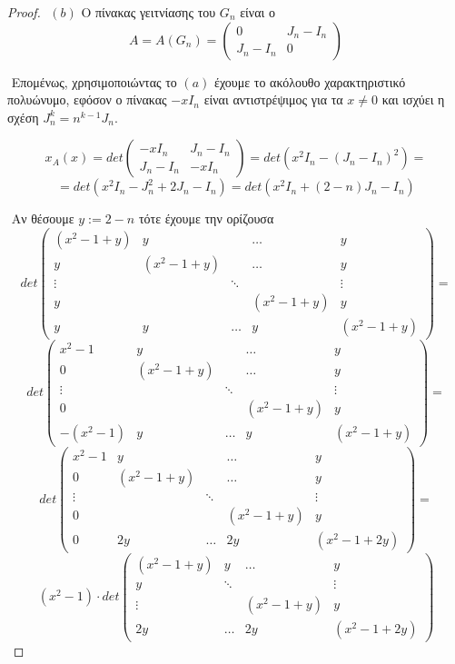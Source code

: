 \documentclass[oneside,a4paper]{article}
\begin{document}
\begin{proof}
	$ $\newline
	$(b)$ Ο πίνακας γειτνίασης του $G_n$ είναι ο
	$$ A = A(G_n) = \begin{pmatrix}
		0 & J_n - I_n \\
		J_n - I_n & 0
\end{pmatrix}$$

	$ $\newline
	Επομένως, χρησιμοποιώντας το $(a)$ έχουμε το ακόλουθο χαρακτηριστικό πολυώνυμο, εφόσον ο πίνακας $-xI_n$ είναι αντιστρέψιμος για τα $x\neq 0$ και ισχύει η σχέση $J^k_n = n^{k-1} J_n$.

	$$x_A (x) = det \begin{pmatrix}
	-xI_n & J_n - I_n \\
	J_n - I_n & -xI_n
	\end{pmatrix} = det \left( x^2 I_n - (J_n-I_n)^2\right)= $$
	$$= det \left( x^2 I_n - J^2_n + 2J_n - I_n\right) = det \left( x^2 I_n + (2-n)J_n - I_n \right)$$

	$ $\newline
	Αν θέσουμε $y:= 2-n$ τότε έχουμε την ορίζουσα
	$$ det \begin{pmatrix}
		(x^2 -1 +y) & y & & \ldots & y \\
		 y & (x^2 - 1 +y) & & \ldots & y \\
		\vdots & &  \ddots & &  \vdots \\
		 y  &  & & (x^2 - 1 +y) &y \\
		 y & y & \ldots & y & (x^2 - 1 +y) 
	\end{pmatrix} = $$
	$$det \begin{pmatrix}
		x^2 -1 & y & & \ldots & y \\
		 0 & (x^2 - 1 +y) & & \ldots & y \\
		\vdots & &  \ddots & &  \vdots \\
		 0  &  & & (x^2 - 1 +y) &y \\
		 -(x^2-1) & y & \ldots & y & (x^2 - 1 +y) 
	\end{pmatrix} = $$
	$$det \begin{pmatrix}
		x^2 -1 & y & & \ldots & y \\
		 0 & (x^2 - 1 +y) & & \ldots & y \\
		\vdots & &  \ddots & &  \vdots \\
		 0  &  & & (x^2 - 1 +y) &y \\
		 0 & 2y & \ldots & 2y & (x^2 - 1 +2y) 
	\end{pmatrix} = $$
	$$ (x^2-1) \cdot det \begin{pmatrix}
		  (x^2 - 1 +y) & y & \ldots & y \\
		 y&  \ddots & &  \vdots \\
		  \vdots & & (x^2 - 1 +y) &y \\
		  2y & \ldots & 2y & (x^2 - 1 +2y) 
	\end{pmatrix} $$


\end{proof}
\end{document}
